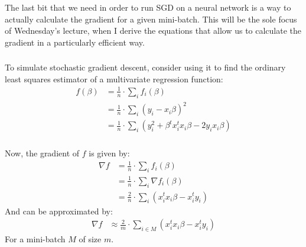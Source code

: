 \documentclass[xetex,mathserif,serif,aspectratio=169]{beamer}
\begin{document}
\begin{frame}[fragile] \frametitle{} \oldB \small


The last bit that we need in order to run SGD on a neural
network is a way to actually calculate the gradient for a
given mini-batch. This will be the sole focus of Wednesday's
lecture, when I derive the equations that allow us to calculate
the gradient in a particularly efficient way.

\end{frame}

\begin{frame}[fragile] \frametitle{} \oldB \small


To simulate stochastic gradient descent, consider using it to find the
ordinary least squares estimator of a multivariate regression function:
\begin{align*}
f(\beta) &= \frac{1}{n} \cdot \sum_i f_i(\beta) \\
&= \frac{1}{n} \cdot \sum_i (y_i - x_i \beta)^2 \\
&= \frac{1}{n} \cdot \sum_i (y_i^2 + \beta^t x_i^t x_i \beta - 2 y_i x_i \beta)
\end{align*}

\end{frame}

\begin{frame}[fragile] \frametitle{} \oldB \small


Now, the gradient of $f$ is given by:
\begin{align*}
\nabla f &= \frac{1}{n} \cdot \sum_i f_i(\beta) \\
&= \frac{1}{n} \cdot \sum_i  \nabla f_i(\beta) \\
&= \frac{2}{n} \cdot \sum_i  (x_i^t x_i \beta - x_i^t y_i)
\end{align*}
And can be approximated by:
\begin{align*}
\nabla f &\approx \frac{2}{m} \cdot \sum_{i \in M}  (x_i^t x_i \beta - x_i^t y_i)
\end{align*}
For a mini-batch $M$ of size $m$.

\end{frame}
\end{document}
